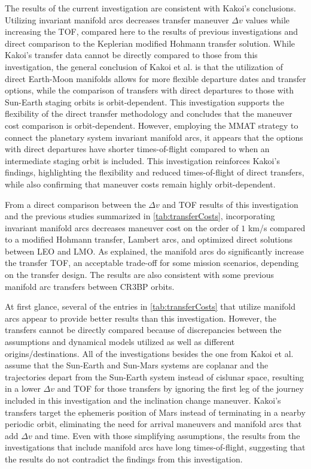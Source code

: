 The results of the current investigation are consistent with Kakoi's conclusions. Utilizing
invariant manifold arcs decreases transfer maneuver $\Delta v$ values while increasing the
TOF\cite{Kakoi:2015}, compared here to the results of previous investigations and direct comparison
to the Keplerian modified Hohmann transfer solution. While Kakoi's transfer data cannot be directly
compared to those from this investigation, the general conclusion of Kakoi et al. is that the
utilization of direct Earth-Moon manifolds allows for more flexible departure dates and transfer
options, while the comparison of transfers with direct departures to those with Sun-Earth staging
orbits is orbit-dependent\cite{Kakoi:2014,Kakoi:2015}. This investigation supports the flexibility
of the direct transfer methodology and concludes that the maneuver cost comparison is
orbit-dependent. However, employing the MMAT strategy to connect the planetary system invariant
manifold arcs, it appears that the options with direct departures have shorter times-of-flight
compared to when an intermediate staging orbit is included. This investigation reinforces Kakoi's
findings, highlighting the flexibility and reduced times-of-flight of direct transfers, while also
confirming that maneuver costs remain highly orbit-dependent.

From a direct comparison between the $\Delta v$ and TOF results of this investigation and the
previous studies summarized in \cref{tab:transferCosts}, incorporating invariant manifold arcs
decreases maneuver cost on the order of $1$ km/s compared to a modified Hohmann transfer, Lambert
arcs\cite{Eagle:2022}, and optimized direct solutions between LEO and LMO\cite{Miele:1999}. As
explained, the manifold arcs do significantly increase the transfer TOF, an acceptable trade-off
for some mission scenarios, depending on the transfer design. The results are also consistent with
some previous manifold arc transfers between CR3BP orbits\cite{Cavallari:2019,Canales:2022}.

At first glance, several of the entries in \cref{tab:transferCosts} that utilize manifold arcs
appear to provide better results than this investigation. However, the transfers cannot be directly
compared because of discrepancies between the assumptions and dynamical models utilized as well as
different origins/destinations. All of the investigations besides the one from Kakoi et al. assume
that the Sun-Earth and Sun-Mars systems are coplanar and the trajectories depart from the Sun-Earth
system instead of cislunar space\cite{Topputo:2005,Haibin:2014}, resulting in a lower $\Delta v$
and TOF for those transfers by ignoring the first leg of the journey included in this investigation
and the inclination change maneuver. Kakoi's transfers target the ephemeris position of Mars
instead of terminating in a nearby periodic orbit, eliminating the need for arrival maneuvers and
manifold arcs that add $\Delta v$ and time\cite{Kakoi:2014}. Even with those simplifying
assumptions, the results from the investigations that include manifold arcs have long
times-of-flight, suggesting that the results do not contradict the findings from this
investigation.

